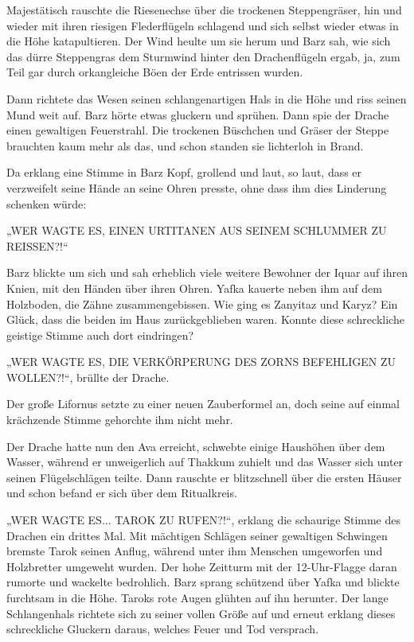 Majestätisch rauschte die Riesenechse über die trockenen Steppengräser, hin und wieder mit ihren riesigen Flederflügeln schlagend und sich selbst wieder etwas in die Höhe katapultieren. Der Wind heulte um sie herum und Barz sah, wie sich das dürre Steppengras dem Sturmwind hinter den Drachenflügeln ergab, ja, zum Teil gar durch orkangleiche Böen der Erde entrissen wurden.

Dann richtete das Wesen seinen schlangenartigen Hals in die Höhe und riss seinen Mund weit auf. Barz hörte etwas gluckern und sprühen. Dann spie der Drache einen gewaltigen Feuerstrahl. Die trockenen Büschchen und Gräser der Steppe brauchten kaum mehr als das, und schon standen sie lichterloh in Brand.

Da erklang eine Stimme in Barz Kopf, grollend und laut, so laut, dass er verzweifelt seine Hände an seine Ohren presste, ohne dass ihm dies Linderung schenken würde:

„WER WAGTE ES, EINEN URTITANEN AUS SEINEM SCHLUMMER ZU REISSEN?!“

Barz blickte um sich und sah erheblich viele weitere Bewohner der Iquar auf ihren Knien, mit den Händen über ihren Ohren. Yafka kauerte neben ihm auf dem Holzboden, die Zähne zusammengebissen. Wie ging es Zanyitaz und Karyz? Ein Glück, dass die beiden im Haus zurückgeblieben waren. Konnte diese schreckliche geistige Stimme auch dort eindringen?

„WER WAGTE ES, DIE VERKÖRPERUNG DES ZORNS BEFEHLIGEN ZU WOLLEN?!“, brüllte der Drache.

Der große Lifornus setzte zu einer neuen Zauberformel an, doch seine auf einmal krächzende Stimme gehorchte ihm nicht mehr.

Der Drache hatte nun den Ava erreicht, schwebte einige Haushöhen über dem Wasser, während er unweigerlich auf Thakkum zuhielt und das Wasser sich unter seinen Flügelschlägen teilte. Dann rauschte er blitzschnell über die ersten Häuser und schon befand er sich über dem Ritualkreis.

„WER WAGTE ES... TAROK ZU RUFEN?!“, erklang die schaurige Stimme des Drachen ein drittes Mal. Mit mächtigen Schlägen seiner gewaltigen Schwingen bremste Tarok seinen Anflug, während unter ihm Menschen umgeworfen und Holzbretter umgeweht wurden. Der hohe Zeitturm mit der 12-Uhr-Flagge daran rumorte und wackelte bedrohlich. Barz sprang schützend über Yafka und blickte furchtsam in die Höhe. Taroks rote Augen glühten auf ihn herunter. Der lange Schlangenhals richtete sich zu seiner vollen Größe auf und erneut erklang dieses schreckliche Gluckern daraus, welches Feuer und Tod versprach.

